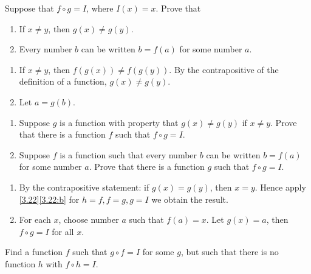 \begin{pr} \label{3.23}
  Suppose that $f \circ g = I$, where $I(x) = x$. Prove that
  \begin{enumerate}[label = (\alph*)]
    \item If $x \neq y$, then $g(x) \neq g(y)$.
    \item \label{3.23:b} Every number $b$ can be written $b = f(a)$ for some number $a$.
  \end{enumerate}
\end{pr}

\begin{solution}
  \begin{enumerate}[label = (\alph*)]
    \item If $x \neq y$, then $f(g(x)) \neq f(g(y))$. By the contrapositive of
    the definition of a function, $g(x) \neq g(y)$.
    \item Let $a = g(b)$.
  \end{enumerate}
\end{solution}

\begin{pr} \label{3.24}
  \begin{enumerate}[label = (\alph*)]
    \item \label{3.24:a} Suppose $g$ is a function with property that $g(x) \neq g(y)$ if $x \neq y$.
    Prove that there is a function $f$ such that $f \circ g = I$.
    \item Suppose $f$ is a function such that every number $b$ can be written
    $b = f(a)$ for some number $a$. Prove that there is a function $g$ such that
    $f \circ g = I$.
  \end{enumerate}
\end{pr}

\begin{solution}
  \begin{enumerate}[label = (\alph*)]
    \item By the contrapositive statement: if $g(x) = g(y)$, then $x = y$.
    Hence apply \ref{3.22}\ref{3.22:b} for $h = f, f = g, g = I$ we obtain the result.
    \item For each $x$, choose number $a$ such that $f(a) = x$. Let $g(x) = a$,
    then $f \circ g = I$ for all $x$.
  \end{enumerate}
\end{solution}

\begin{pr} \label{3.25}
  Find a function $f$ such that $g \circ f = I$ for some $g$, but such that there is
  no function $h$ with $f \circ h = I$.
\end{pr}

